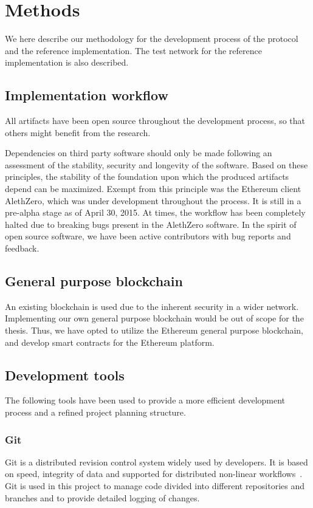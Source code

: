 \chapter{Methods}
We here describe our methodology for the development process of the protocol and the reference implementation. The test network for the reference implementation is also described.

\section{Implementation workflow}
All artifacts have been open source throughout the development process, so that others might benefit from the research.

Dependencies on third party software should only be made following an assessment of the stability, security and longevity of the software. Based on these principles, the stability of the foundation upon which the produced artifacts depend can be maximized. Exempt from this principle was the Ethereum client AlethZero, which was under development throughout the process. It is still in a pre-alpha stage as of April 30, 2015. At times, the workflow has been completely halted due to breaking bugs present in the AlethZero software. In the spirit of open source software, we have been active contributors with bug reports and feedback.

\section{General purpose blockchain}
An existing blockchain is used due to the inherent security in a wider network. Implementing our own general purpose blockchain would be out of scope for the thesis. Thus, we have opted to utilize the Ethereum general purpose blockchain, and develop smart contracts for the Ethereum platform.

\section{Development tools}
The following tools have been used to provide a more efficient development process and a refined project planning structure.

\subsection{Git}
Git is a distributed revision control system widely used by developers. It is based on speed, integrity of data and supported for distributed non-linear workflows~\cite{git}. Git is used in this project to manage code divided into different repositories and branches and to provide detailed logging of changes. 

